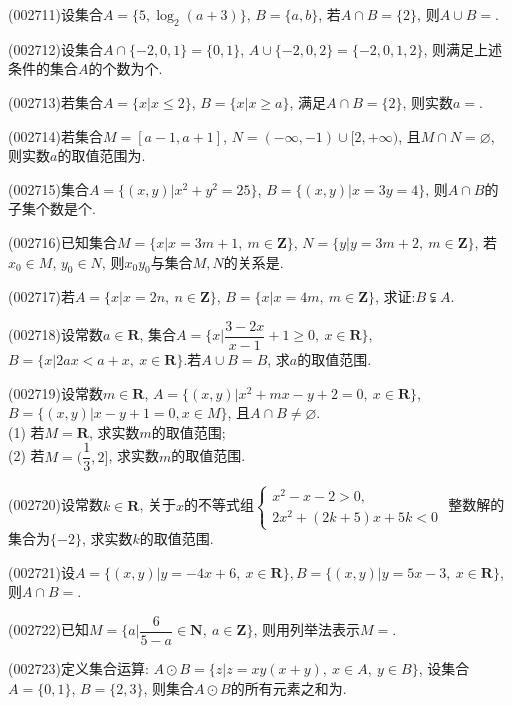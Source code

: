 \item (002711)设集合$A=\{5,\log_2(a+3)\}$, $B=\{a,b\}$, 若$A\cap B=\{2\}$, 则$A\cup B=$.
\item (002712)设集合$A\cap \{-2,0,1\}=\{0,1\}$, $A\cup \{-2,0,2\}=\{-2,0,1,2\}$, 则满足上述条件的集合$A$的个数为个.
\item (002713)若集合$A=\{x|x\le 2\}$, $B=\{x|x\ge a\}$, 满足$A\cap B=\{2\}$, 则实数$a=$.
\item (002714)若集合$M=[a-1,a+1]$, $N=(-\infty,-1)\cup [2,+\infty)$, 且$M\cap N=\varnothing$, 则实数$a$的取值范围为.
\item (002715)集合$A=\{(x,y)|x^2+y^2=25\}$, $B=\{(x,y)|x=3y=4\}$, 则$A\cap B$的子集个数是个.
\item (002716)已知集合$M=\{x|x=3m+1, \ m\in \mathbf{Z}\}$, $N=\{y|y=3m+2, \ m\in \mathbf{Z}\}$, 若$x_0\in M$, $y_0\in N$, 则$x_0y_0$与集合$M,N$的关系是.
\item (002717)若$A=\{x|x=2n,\ n\in \mathbf{Z}\}$, $B=\{x|x=4m,\ m\in \mathbf{Z}\}$, 求证:$B\subsetneqq A$.
\item (002718)设常数$a\in \mathbf{R}$, 集合$A=\{x|\dfrac{3-2x}{x-1}+1 \ge 0, \ x\in \mathbf{R}\}$, $B=\{x|2ax<a+x, \ x\in \mathbf{R} \}$.若$A\cup B=B$, 求$a$的取值范围.
\item (002719)设常数$m\in \mathbf{R}$, $A=\{(x,y)|x^2+mx-y+2=0,\ x\in \mathbf{R}\}$, $B=\{(x,y)|x-y+1=0, x\in M\}$, 且$A\cap B\ne\varnothing$.\\
(1) 若$M=\mathbf{R}$, 求实数$m$的取值范围;\\
(2) 若$M=(\dfrac13,2]$, 求实数$m$的取值范围.
\item (002720)设常数$k\in \mathbf{R}$, 关于$x$的不等式组$\begin{cases} x^2-x-2>0, \\ 2x^2+(2k+5)x+5k<0 \end{cases}$ 整数解的集合为$\{-2\}$, 求实数$k$的取值范围.
\item (002721)设$A=\{(x,y)|y=-4x+6,\ x\in \mathbf{R}\}, B=\{(x,y)|y=5x-3,\ x\in \mathbf{R}\}$, 则$A\cap B=$.
\item (002722)已知$M=\{a|\dfrac6{5-a}\in \mathbf{N}, \ a\in \mathbf{Z}\}$, 则用列举法表示$M=$.
\item (002723)定义集合运算: $A\odot B=\{z|z=xy(x+y), \ x\in A, \ y\in B \}$, 设集合$A=\{0,1\}$, $B=\{2,3\}$, 则集合$A\odot B$的所有元素之和为.

